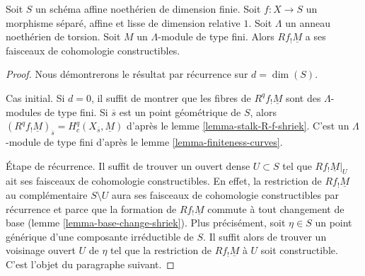 \begin{lemma}
\label{lemma-constant-shriek-rel-dim-1}
Soit $S$ un schéma affine noethérien de dimension finie.
Soit $f : X \to S$ un morphisme séparé, affine et lisse
de dimension relative $1$. Soit $\Lambda$ un anneau noethérien
de torsion. Soit $M$ un $\Lambda$-module de type fini.
Alors $Rf_!\underline{M}$ a ses faisceaux de cohomologie constructibles.
\end{lemma}

\begin{proof}
Nous démontrerons le résultat par récurrence sur $d = \dim(S)$.

\medskip\noindent
Cas initial. Si $d = 0$, il suffit de montrer que les fibres
de $R^qf_!\underline{M}$ sont des $\Lambda$-modules de type fini.
Si $\overline{s}$ est un point géométrique de $S$, alors
$(R^qf_!\underline{M})_{\overline{s}} = H^q_c(X_{\overline{s}}, \underline{M})$
d'après le lemme \ref{lemma-stalk-R-f-shriek}.
C'est un $\Lambda$-module de type fini d'après le lemme \ref{lemma-finiteness-curves}.

\medskip\noindent
Étape de récurrence. Il suffit de trouver un ouvert dense $U \subset S$ tel
que $Rf_!\underline{M}|_U$ ait ses faisceaux de cohomologie constructibles.
En effet, la restriction de $Rf_!\underline{M}$ au complémentaire
$S \setminus U$ aura ses faisceaux de cohomologie constructibles par récurrence
et parce que la formation de $Rf_!\underline{M}$ commute
à tout changement de base (lemme \ref{lemma-base-change-shriek}).
Plus précisément, soit $\eta \in S$ un point générique d'une composante
irréductible de $S$. Il suffit alors de trouver un voisinage ouvert $U$
de $\eta$ tel que la restriction de $Rf_!\underline{M}$
à $U$ soit constructible. C'est l'objet du paragraphe suivant.


\end{proof}
